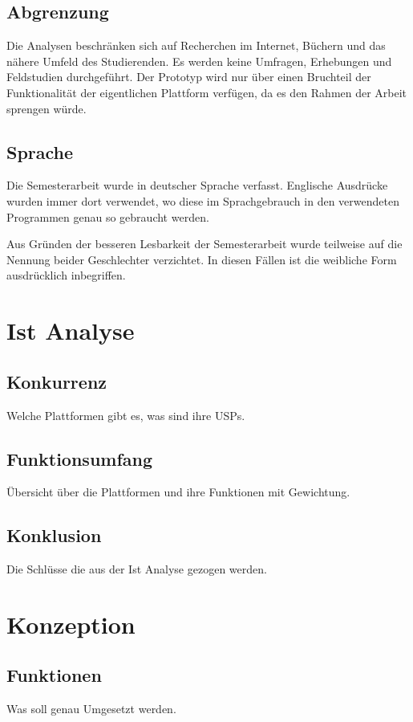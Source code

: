 \documentclass[abstracton,liststotoc,bibtotoc]{scrreprt}
\begin{document}
    \section{Abgrenzung}
    Die Analysen beschränken sich auf Recherchen im Internet, Büchern und das 
    nähere Umfeld des Studierenden. Es werden keine Umfragen, Erhebungen und 
    Feldstudien durchgeführt. Der Prototyp wird nur über einen Bruchteil der 
    Funktionalität der eigentlichen Plattform verfügen, da es den Rahmen
    der Arbeit sprengen würde.

    \section{Sprache}
    Die Semesterarbeit wurde in deutscher Sprache verfasst. Englische Ausdrücke 
    wurden immer dort verwendet, wo diese im Sprachgebrauch in den verwendeten 
    Programmen genau so gebraucht werden.
    
    Aus Gründen der besseren Lesbarkeit der Semesterarbeit wurde teilweise auf 
    die Nennung beider Geschlechter verzichtet. In diesen Fällen ist die 
    weibliche Form ausdrücklich inbegriffen.
    
    \chapter{Ist Analyse}
    \section{Konkurrenz}
    Welche Plattformen gibt es, was sind ihre USPs.
    \section{Funktionsumfang}
    Übersicht über die Plattformen und ihre Funktionen mit Gewichtung.
    \section{Konklusion}
    Die Schlüsse die aus der Ist Analyse gezogen werden.
    
    \chapter{Konzeption}
    \section{Funktionen}
    Was soll genau Umgesetzt werden.
\end{document}
